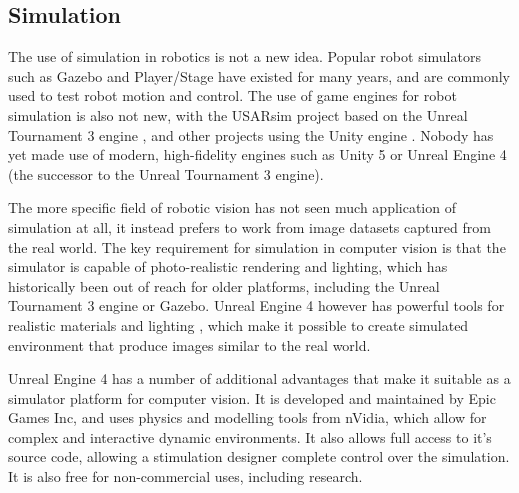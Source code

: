 
\subsection{Simulation}

The use of simulation in robotics is not a new idea. Popular robot simulators such as Gazebo \cite{Koenig2004} and Player/Stage \cite{Gerkey2003} have existed for many years, and are commonly used to test robot motion and control. The use of game engines for robot simulation is also not new, with the USARsim project based on the Unreal Tournament 3 engine \cite{Carpin2007}, and other projects using the Unity engine \cite{mattingly2012robot}. Nobody has yet made use of modern, high-fidelity engines such as Unity 5 or Unreal Engine 4 (the successor to the Unreal Tournament 3 engine).

The more specific field of robotic vision has not seen much application of simulation at all, it instead prefers to work from image datasets captured from the real world.  The key requirement for simulation in computer vision is that the simulator is capable of photo-realistic rendering and lighting, which has historically been out of reach for older platforms, including the Unreal Tournament 3 engine or Gazebo. Unreal Engine 4 however has powerful tools for realistic materials and lighting \cite{karis2013real}, which make it possible to create simulated environment that produce images similar to the real world.

Unreal Engine 4 has a number of additional advantages that make it suitable as a simulator platform for computer vision. It is developed and maintained by Epic Games Inc, and uses physics and modelling tools from nVidia, which allow for complex and interactive dynamic environments. It also allows full access to it's source code, allowing a stimulation designer complete control over the simulation. It is also free for non-commercial uses, including research.

